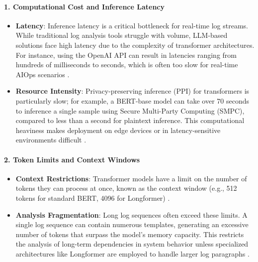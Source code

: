 \paragraph{1. Computational Cost and Inference Latency}
\begin{itemize}
    \item \textbf{Latency}: Inference latency is a critical bottleneck for real-time log streams. While traditional log analysis tools struggle with volume, LLM-based solutions face high latency due to the complexity of transformer architectures. For instance, using the OpenAI API can result in latencies ranging from hundreds of milliseconds to seconds, which is often too slow for real-time AIOps scenarios \cite{PreLog}.
    \item \textbf{Resource Intensity}: Privacy-preserving inference (PPI) for transformers is particularly slow; for example, a BERT-base model can take over 70 seconds to inference a single sample using Secure Multi-Party Computing (SMPC), compared to less than a second for plaintext inference. This computational heaviness makes deployment on edge devices or in latency-sensitive environments difficult \cite{PrivateTransformerInference}.
\end{itemize}

\paragraph{2. Token Limits and Context Windows}
\begin{itemize}
    \item \textbf{Context Restrictions}: Transformer models have a limit on the number of tokens they can process at once, known as the context window (e.g., 512 tokens for standard BERT, 4096 for Longformer) \cite{LogFiT}.
    \item \textbf{Analysis Fragmentation}: Long log sequences often exceed these limits. A single log sequence can contain numerous templates, generating an excessive number of tokens that surpass the model's memory capacity. This restricts the analysis of long-term dependencies in system behavior unless specialized architectures like Longformer are employed to handle larger log paragraphs \cite{almodovar-etal-2022-language}.
\end{itemize}

